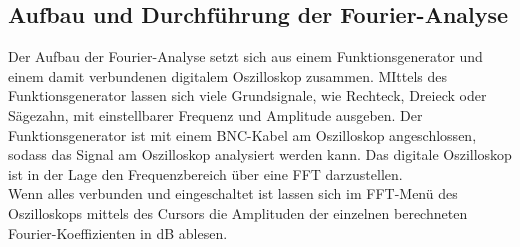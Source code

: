 \subsection{Aufbau und Durchführung der Fourier-Analyse}
Der Aufbau der Fourier-Analyse setzt sich aus einem Funktionsgenerator und
einem damit verbundenen digitalem Oszilloskop zusammen. MIttels des
Funktionsgenerator lassen sich viele Grundsignale, wie Rechteck, Dreieck oder
Sägezahn, mit einstellbarer Frequenz und Amplitude ausgeben. Der
Funktionsgenerator ist mit einem BNC-Kabel am Oszilloskop angeschlossen, sodass
das Signal am Oszilloskop analysiert werden kann. Das digitale Oszilloskop ist
in der Lage den Frequenzbereich über eine FFT darzustellen.\\ \noindent Wenn
alles verbunden und eingeschaltet ist lassen sich im FFT-Menü des Oszilloskops
mittels des Cursors die Amplituden der einzelnen berechneten
Fourier-Koeffizienten in dB ablesen.